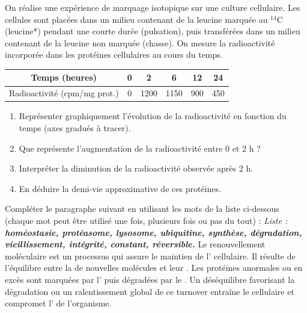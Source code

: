 \documentclass[11pt]{article}
\begin{document}
\begin{exercice}
On réalise une expérience de marquage isotopique sur une culture cellulaire. Les cellules sont placées dans un milieu contenant de la leucine marquée au $^{14}$C (leucine*) pendant une courte durée (pulsation), puis transférées dans un milieu contenant de la leucine non marquée (chasse). On mesure la radioactivité incorporée dans les protéines cellulaires au cours du temps.

\begin{tabular}{|c|c|c|c|c|c|}
\hline
Temps (heures) & 0 & 2 & 6 & 12 & 24 \\
\hline
Radioactivité (cpm/mg prot.) & 0 & 1200 & 1150 & 900 & 450 \\
\hline
\end{tabular}

\begin{enumerate}
    \item Représenter graphiquement l'évolution de la radioactivité en fonction du temps (axes gradués à tracer).
    \item Que représente l'augmentation de la radioactivité entre 0 et 2 h ?
    \item Interpréter la diminution de la radioactivité observée après 2 h.
    \item En déduire la demi-vie approximative de ces protéines.
\end{enumerate}
\end{exercice}

\begin{exercice}
Compléter le paragraphe suivant en utilisant les mots de la liste ci-dessous (chaque mot peut être utilisé une fois, plusieurs fois ou pas du tout) :
\medskip
\noindent \textit{Liste : \textbf{homéostasie, protéasome, lysosome, ubiquitine, synthèse, dégradation, vieillissement, intégrité, constant, réversible.}}
\medskip
\noindent Le renouvellement moléculaire est un processus \underline{\hspace{3cm}} qui assure le maintien de l'\underline{\hspace{3cm}} cellulaire. Il résulte de l'équilibre entre la \underline{\hspace{3cm}} de nouvelles molécules et leur \underline{\hspace{3cm}}. Les protéines anormales ou en excès sont marquées par l'\underline{\hspace{3cm}} puis dégradées par le \underline{\hspace{3cm}}. Un déséquilibre favorisant la dégradation ou un ralentissement global de ce turnover entraîne le \underline{\hspace{3cm}} cellulaire et compromet l'\underline{\hspace{3cm}} de l'organisme.
\end{exercice}
\end{document}
